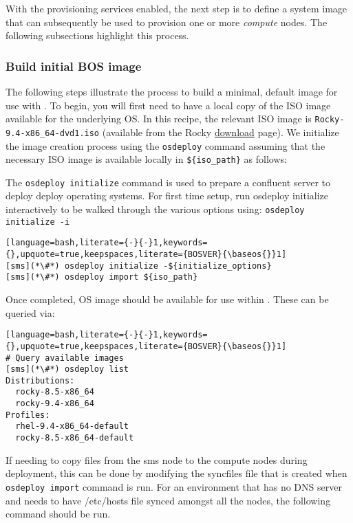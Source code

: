 
With the provisioning services enabled, the next step is to define
a system image that can subsequently be
used to provision one or more {\em compute} nodes. The following subsections highlight this process.

\subsubsection{Build initial BOS image} \label{sec:assemble_bos}
The following steps illustrate the process to build a minimal, default image for use with \Confluent{}. To begin, you will
first need to have a local copy of the ISO image available for the underlying OS. In this recipe, the relevant ISO image
is \texttt{Rocky-9.4-x86\_64-dvd1.iso} (available from the Rocky
\href{https://rockylinux.org/download/}{\color{blue}download} page).
We initialize the image
creation process using the \texttt{osdeploy} command assuming that the necessary ISO image is available locally in
\texttt{\$\{iso\_path\}} as follows:

The \texttt{osdeploy initialize} command is used to prepare a confluent server to deploy deploy operating systems.
For first time setup, run osdeploy initialize interactively to be walked through the various options using: 
\texttt{osdeploy initialize -i}

\begin{lstlisting}[language=bash,literate={-}{-}1,keywords={},upquote=true,keepspaces,literate={BOSVER}{\baseos{}}1]
[sms](*\#*) osdeploy initialize -${initialize_options}
[sms](*\#*) osdeploy import ${iso_path}

\end{lstlisting}

\noindent Once completed, OS image should be available for use within \Confluent{}. These can be queried via:

\begin{lstlisting}[language=bash,literate={-}{-}1,keywords={},upquote=true,keepspaces,literate={BOSVER}{\baseos{}}1]
# Query available images
[sms](*\#*) osdeploy list
Distributions:
  rocky-8.5-x86_64
  rocky-9.4-x86_64
Profiles:
  rhel-9.4-x86_64-default
  rocky-8.5-x86_64-default
\end{lstlisting}

If needing to copy files from the sms node to the compute nodes during deployment, this can be done by
modifying the syncfiles file that is created when \texttt{osdeploy import} command is run. For an environment
that has no DNS server and needs to have /etc/hosts file synced amongst all the nodes, the following command
should be run.   

